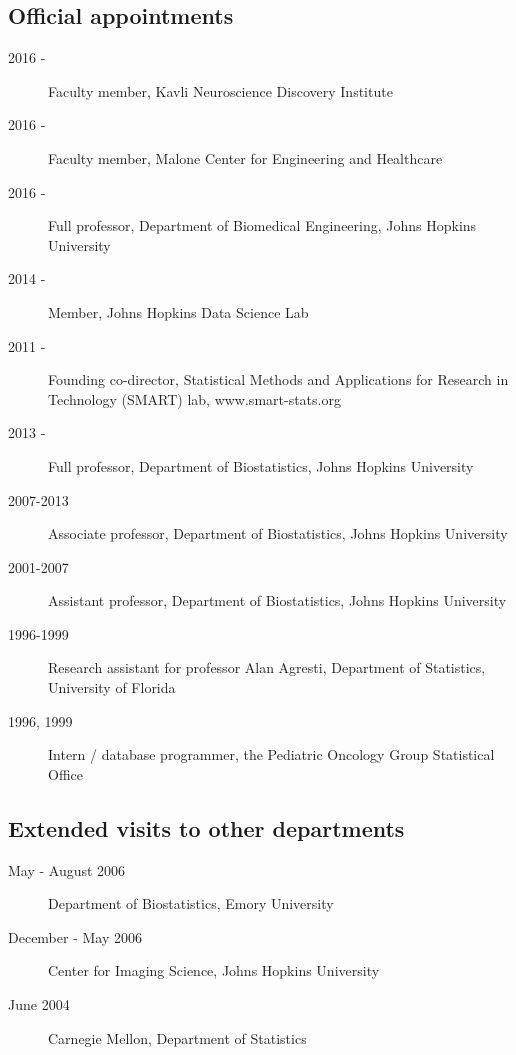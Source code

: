 \documentclass[12pt]{article}
\begin{document}
\subsection*{Official appointments}
\begin{description}
\item[\textnormal{2016} - ] Faculty member, Kavli Neuroscience Discovery Institute 
\item[\textnormal{2016} - ] Faculty member, Malone Center for Engineering and Healthcare
\item[\textnormal{2016} - ] Full professor, Department of Biomedical Engineering, Johns Hopkins University
\item[\textnormal{2014} - ] Member, Johns Hopkins Data Science Lab
\item[\textnormal{2011} - ] Founding co-director, Statistical Methods and Applications for Research in Technology (SMART) lab, www.smart-stats.org
\item[\textnormal{2013} - ] Full professor, Department of Biostatistics, Johns Hopkins University
\item[\textnormal{2007-2013}] Associate professor, Department of Biostatistics, Johns Hopkins University
\item[\textnormal{2001-2007}] Assistant professor, Department of Biostatistics, Johns Hopkins University
\item[\textnormal{1996-1999}] Research assistant for professor Alan Agresti, Department of Statistics, University of Florida
\item[\textnormal{1996, 1999}] Intern /  database programmer, the Pediatric Oncology Group Statistical Office
\end{description}

\subsection*{Extended visits to other departments}
\begin{description}
\item[\textnormal{May - August 2006}] Department of Biostatistics, Emory University
\item[\textnormal{December - May 2006}] Center for Imaging Science, Johns Hopkins University
\item[\textnormal{June 2004}] Carnegie Mellon, Department of Statistics 
\end{description}
\end{document}
